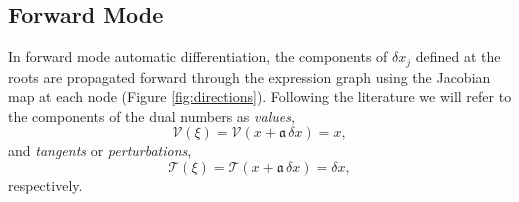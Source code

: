 \subsection{Forward Mode}

In forward mode automatic differentiation, the components of $\delta x_{j}$ defined at 
the roots are propagated forward through the expression graph using the Jacobian map at each
node (Figure \ref{fig:directions}).  Following the literature we will refer to the components of the dual
numbers as \textit{values},
%
\begin{equation*}
\mathcal{V} \! \left( \xi \right) 
= \mathcal{V} \! \left( x + \mathfrak{a} \, \delta x \right) 
= x,
\end{equation*}
%
and \textit{tangents} or \textit{perturbations},
\begin{equation*}
\mathcal{T} \! \left( \xi \right) 
= \mathcal{T} \! \left( x + \mathfrak{a} \, \delta x \right) 
= \delta x,
\end{equation*}
%
respectively.

